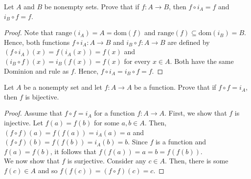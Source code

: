 \documentclass[12pt]{article}
\newcommand{\Dom}[1]{\mathrm{dom}(#1)}
\newcommand{\Range}[1]{\mathrm{range}(#1)}
\newenvironment{problem}[2][Problem]{\begin{trivlist} \item[\hskip \labelsep {\bfseries #1}\hskip \labelsep {\bfseries #2.}]}{\end{trivlist}}
\begin{document}
    \begin{problem}{40}
      Let $A$ and $B$ be nonempty sets. Prove that if $f:A\to B$, then $f\circ i_{A} = f$ and $i_{B} \circ f = f$.
    \begin{proof}
      Note that $\Range{i_{A}} = A = \Dom{f}$ and $\Range{f} \subseteq \Dom{i_{B}} = B$. Hence, both functions $f\circ i_{A}:A\to B$ and $i_{B}\circ f:A\to B$ are defined by $(f\circ i_{A})(x) = f(i_{A}(x))=f(x)$ and $(i_{B}\circ f)(x) = i_{B}(f(x))= f(x)$ for every $x\in A$. Both have the same Dominion and rule as $f$. Hence, $f\circ i_{A} = i_{B} \circ f = f$.
    \end{proof}
    \end{problem}
    \begin{problem}{41}
      Let $A$ be a nonempty set and let $f:A \to A$ be a function. Prove that if $f\circ f = i_{A}$, then $f$ is bijective.
    \begin{proof}
      Assume that $f\circ f = i_{A}$ for a function $f:A\to A$. First, we show that $f$ is injective. Let $f(a)=f(b)$ for some $a,b\in A$. Then, $(f\circ f)(a) = f(f(a)) = i_{A}(a) = a$ and $(f\circ f)(b) = f(f(b)) = i_{A}(b) = b$. Since $f$ is a function and $f(a)=f(b)$, it follows that $f(f(a)) = a = b = f(f(b))$.\\
      We now show that $f$ is surjective. Consider any $c\in A$. Then, there is some $f(c)\in A$ and so $f(f(c)) = (f\circ f)(c) = c$.
    \end{proof}
    \end{problem}
\end{document}

